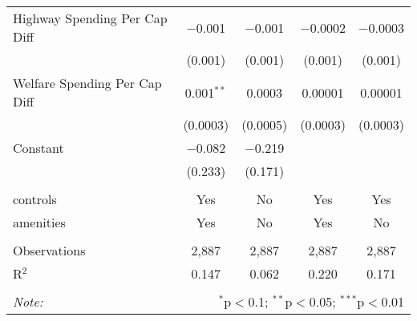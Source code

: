 \begin{table}[!htbp]
\begin{tabular}{@{\extracolsep{5pt}}lcccc}
  Highway Spending Per Cap Diff & $-$0.001 & $-$0.001 & $-$0.0002 & $-$0.0003 \\ 
  & (0.001) & (0.001) & (0.001) & (0.001) \\ 
  Welfare Spending Per Cap Diff & 0.001$^{**}$ & 0.0003 & 0.00001 & 0.00001 \\ 
  & (0.0003) & (0.0005) & (0.0003) & (0.0003) \\ 
  Constant & $-$0.082 & $-$0.219 &  &  \\ 
  & (0.233) & (0.171) &  &  \\ 
 \hline \\[-1.8ex] 
controls & Yes & No & Yes & Yes \\ 
amenities & Yes & No & Yes & No \\ 
\hline \\[-1.8ex] 
Observations & 2,887 & 2,887 & 2,887 & 2,887 \\ 
R$^{2}$ & 0.147 & 0.062 & 0.220 & 0.171 \\ 
\hline 
\hline \\[-1.8ex] 
\textit{Note:}  & \multicolumn{4}{r}{$^{*}$p$<$0.1; $^{**}$p$<$0.05; $^{***}$p$<$0.01} \\ 
\end{tabular} 
\end{table} 
